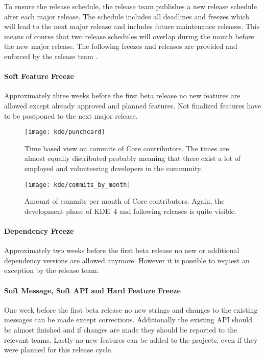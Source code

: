 To ensure the release schedule, the release team publishes a new release
schedule after each major release. The schedule includes all deadlines and
freezes which will lead to the next major release and includes future
maintenance releases. This means of course that two release schedules will
overlap during the month before the new major release. The following freezes
and releases are provided and enforced by the release team
\cite{KDEReleaseSchedule}.

\paragraph{Soft Feature Freeze}

Approximately three weeks before the first beta release no new features are
allowed except already approved and planned features. Not finalized features
have to be postponed to the next major release.

\begin{figure}[hbtp]
  \centering
  \texttt{[image: kde/punchcard]}
  \caption[Time based view on commits, KDE]
  {Time based view on commits of Core contributors. The times are almost
    equally distributed probably meaning that there exist a lot of employed and
    volunteering developers in the community.}
\end{figure}

\begin{figure}[htbp]
  \centering
  \texttt{[image: kde/commits\_by\_month]}
  \caption[Commits by month, KDE]
  {Amount of commits per month of Core contributors. Again, the development
    phase of KDE~4 and following releases is quite visible.}
\end{figure}

\paragraph{Dependency Freeze}

Approximately two weeks before the first beta release no new or additional
dependency versions are allowed anymore. However it is possible to request an
exception by the release team.

\paragraph{Soft Message, Soft API and Hard Feature Freeze}

One week before the first beta release no new strings and changes to the
existing messages can be made except corrections. Additionally the existing
\ac{API} should be almost finished and if changes are made they should be
reported to the relevant teams. Lastly no new features can be added to the
projects, even if they were planned for this release cycle.

